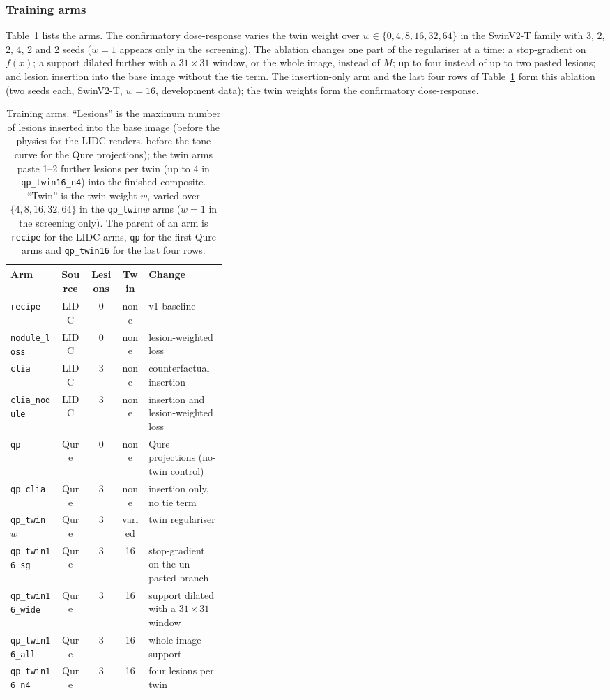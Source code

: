 \subsubsection{Training arms}
Table~\ref{tab:arms} lists the arms. The confirmatory dose-response varies the twin weight over $w\in\{0,4,8,16,32,64\}$ in the SwinV2-T
family with 3, 2, 2, 4, 2 and 2 seeds ($w=1$ appears only in the screening). The ablation changes one part of the regulariser at a time: a
stop-gradient on $f(x)$; a support dilated further with a $31\times31$ window, or the whole image, instead of $M$; up to four instead of up
to two pasted lesions; and lesion insertion into the base image without the tie term. The insertion-only arm and the last four rows of
Table~\ref{tab:arms} form this ablation (two seeds each, SwinV2-T, $w=16$, development data); the twin weights form the confirmatory
dose-response.

\begin{table}[!t]
\centering
\caption{Training arms. ``Lesions'' is the maximum number of lesions inserted into the base image (before the physics for the LIDC
renders, before the tone curve for the Qure projections); the twin arms paste 1--2 further lesions per twin (up to 4 in
\texttt{qp\_twin16\_n4}) into the finished composite. ``Twin'' is the twin weight $w$, varied over $\{4,8,16,32,64\}$ in the
\texttt{qp\_twin}$w$ arms ($w=1$ in the screening only). The parent of an arm is \texttt{recipe} for the LIDC arms, \texttt{qp} for the
first Qure arms and \texttt{qp\_twin16} for the last four rows.}
\label{tab:arms}
\footnotesize
\setlength{\tabcolsep}{3pt}
\begin{tabular}{@{}lccc>{\raggedright\arraybackslash}p{0.36\linewidth}@{}}
\toprule
Arm & Source & Lesions & Twin & Change \\
\midrule
\texttt{recipe} & LIDC & 0 & none & v1 baseline \\
\texttt{nodule\_loss} & LIDC & 0 & none & lesion-weighted loss \\
\texttt{clia} & LIDC & 3 & none & counterfactual insertion \\
\texttt{clia\_nodule} & LIDC & 3 & none & insertion and lesion-weighted loss \\
\texttt{qp} & Qure & 0 & none & Qure projections (no-twin control) \\
\texttt{qp\_clia} & Qure & 3 & none & insertion only, no tie term \\
\texttt{qp\_twin}$w$ & Qure & 3 & varied & twin regulariser \\
\texttt{qp\_twin16\_sg} & Qure & 3 & 16 & stop-gradient on the un-pasted branch \\
\texttt{qp\_twin16\_wide} & Qure & 3 & 16 & support dilated with a $31\times31$ window \\
\texttt{qp\_twin16\_all} & Qure & 3 & 16 & whole-image support \\
\texttt{qp\_twin16\_n4} & Qure & 3 & 16 & four lesions per twin \\
\bottomrule
\end{tabular}
\end{table}

